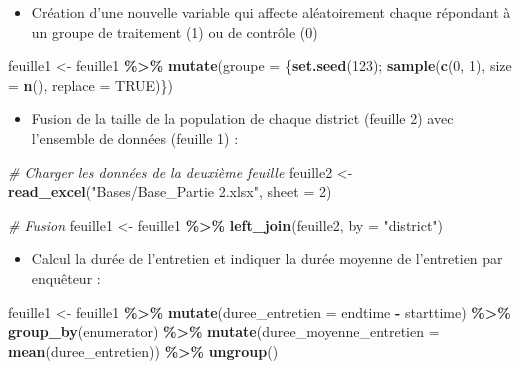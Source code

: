 \documentclass[
]{article}
\newenvironment{Shaded}{\begin{snugshade}}{\end{snugshade}}
\newcommand{\AttributeTok}[1]{\textcolor[rgb]{0.13,0.29,0.53}{#1}}
\newcommand{\CommentTok}[1]{\textcolor[rgb]{0.56,0.35,0.01}{\textit{#1}}}
\newcommand{\ConstantTok}[1]{\textcolor[rgb]{0.56,0.35,0.01}{#1}}
\newcommand{\DecValTok}[1]{\textcolor[rgb]{0.00,0.00,0.81}{#1}}
\newcommand{\FunctionTok}[1]{\textcolor[rgb]{0.13,0.29,0.53}{\textbf{#1}}}
\newcommand{\NormalTok}[1]{#1}
\newcommand{\OtherTok}[1]{\textcolor[rgb]{0.56,0.35,0.01}{#1}}
\newcommand{\SpecialCharTok}[1]{\textcolor[rgb]{0.81,0.36,0.00}{\textbf{#1}}}
\newcommand{\StringTok}[1]{\textcolor[rgb]{0.31,0.60,0.02}{#1}}
\providecommand{\tightlist}{%
  \setlength{\itemsep}{0pt}\setlength{\parskip}{0pt}}
\begin{document}
\begin{itemize}
\tightlist
\item
  Création d'une nouvelle variable qui affecte aléatoirement chaque
  répondant à un groupe de traitement (1) ou de contrôle (0)
\end{itemize}

\begin{Shaded}
\begin{Highlighting}[]
\NormalTok{feuille1 }\OtherTok{\textless{}{-}}\NormalTok{ feuille1 }\SpecialCharTok{\%\textgreater{}\%}
  \FunctionTok{mutate}\NormalTok{(}\AttributeTok{groupe =}\NormalTok{ \{}\FunctionTok{set.seed}\NormalTok{(}\DecValTok{123}\NormalTok{); }\FunctionTok{sample}\NormalTok{(}\FunctionTok{c}\NormalTok{(}\DecValTok{0}\NormalTok{, }\DecValTok{1}\NormalTok{), }\AttributeTok{size =} \FunctionTok{n}\NormalTok{(), }\AttributeTok{replace =} \ConstantTok{TRUE}\NormalTok{)\})}
\end{Highlighting}
\end{Shaded}

\begin{itemize}
\tightlist
\item
  Fusion de la taille de la population de chaque district (feuille 2)
  avec l'ensemble de données (feuille 1) :
\end{itemize}

\begin{Shaded}
\begin{Highlighting}[]
\CommentTok{\# Charger les données de la deuxième feuille}
\NormalTok{feuille2 }\OtherTok{\textless{}{-}} \FunctionTok{read\_excel}\NormalTok{(}\StringTok{"Bases/Base\_Partie 2.xlsx"}\NormalTok{, }\AttributeTok{sheet =} \DecValTok{2}\NormalTok{)}

\CommentTok{\# Fusion}
\NormalTok{feuille1 }\OtherTok{\textless{}{-}}\NormalTok{ feuille1 }\SpecialCharTok{\%\textgreater{}\%}
  \FunctionTok{left\_join}\NormalTok{(feuille2, }\AttributeTok{by =} \StringTok{"district"}\NormalTok{)}
\end{Highlighting}
\end{Shaded}

\begin{itemize}
\tightlist
\item
  Calcul la durée de l'entretien et indiquer la durée moyenne de
  l'entretien par enquêteur :
\end{itemize}

\begin{Shaded}
\begin{Highlighting}[]
\NormalTok{feuille1 }\OtherTok{\textless{}{-}}\NormalTok{ feuille1 }\SpecialCharTok{\%\textgreater{}\%}
  \FunctionTok{mutate}\NormalTok{(}\AttributeTok{duree\_entretien =}\NormalTok{ endtime }\SpecialCharTok{{-}}\NormalTok{ starttime) }\SpecialCharTok{\%\textgreater{}\%}
  \FunctionTok{group\_by}\NormalTok{(enumerator) }\SpecialCharTok{\%\textgreater{}\%}
  \FunctionTok{mutate}\NormalTok{(}\AttributeTok{duree\_moyenne\_entretien =} \FunctionTok{mean}\NormalTok{(duree\_entretien)) }\SpecialCharTok{\%\textgreater{}\%}
  \FunctionTok{ungroup}\NormalTok{()}
\end{Highlighting}
\end{Shaded}
\end{document}
